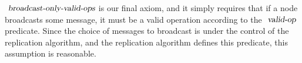 $\isa{broadcast-only-valid-ops}$ is our final axiom, and it simply requires that if a node broadcasts some message, it must be a valid operation according to the $\isa{valid-op}$ predicate.
Since the choice of messages to broadcast is under the control of the replication algorithm, and the replication algorithm defines this predicate, this assumption is reasonable.
